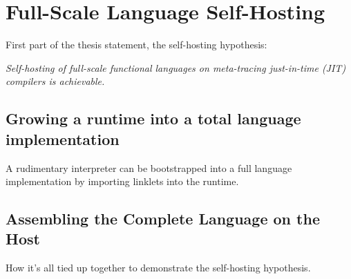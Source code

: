 \chapter{Full-Scale Language Self-Hosting}

    \begin{chapterpoint}

        First part of the thesis statement, the self-hosting hypothesis:

        \textit{Self-hosting of full-scale functional languages on meta-tracing just-in-time (JIT) compilers is achievable.}
    \end{chapterpoint}

    \section{Growing a runtime into a total language implementation}

        \begin{mainpoint}
            A rudimentary interpreter can be bootstrapped into a full language implementation by importing linklets into the runtime.
        \end{mainpoint}

    \section{Assembling the Complete Language on the Host} 

        \begin{mainpoint}
            How it's all tied up together to demonstrate the self-hosting hypothesis.
        \end{mainpoint}
	